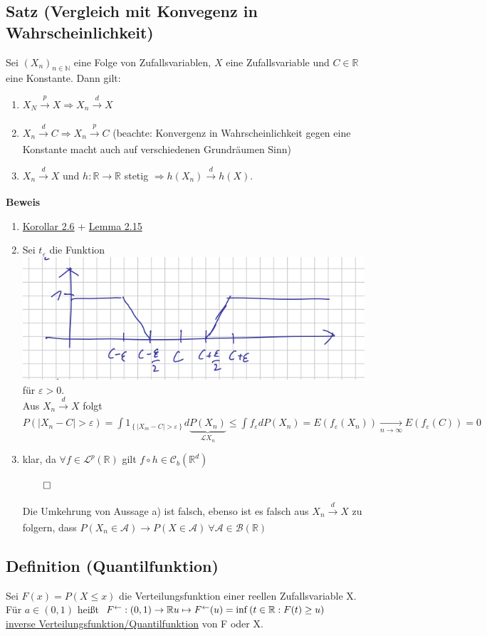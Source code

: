 \documentclass[german,10pt,oneside, fleqn, a4paper]{article}
\newcommand {\R}	{\mathbb{R}}
\newcommand {\N}	{\mathbb{N}}
\newcommand{\Ra}	{\Rightarrow}
\newcommand{\ra}{\rightarrow}
\newcommand{\brc}[1]{\left(#1\right)}
\newcommand{\brac}[1]{\left\lbrace #1\right\rbrace}
\newcommand{\folge}[3][\N]{\left(#2_#3\right)_{#3\in #1}}
\newcommand{\QED}{\begin{flushright}$\qed$\end{flushright}}
\newcommand{\mc}[1]{\mathcal{#1}}
\newcommand{\lp}[1]{\mc{L}^{#1}}
\newcommand{\beweis}{\textbf{Beweis}\\}
\newcommand{\toinf}{\rightarrow\infty}
\newcommand{\1}[1]{1_{#1}}
\newcommand{\2}[1]{\1{\brac{#1}}}
\newcommand{\xr}[2][]{\xrightarrow[#1]{#2}}
\newcommand{\cb}[1][d]{\mc{C}_b\brc{\R^{#1}}}
\begin{document}
\subsection{Satz (Vergleich mit Konvegenz in Wahrscheinlichkeit)}
\label{3.4}
Sei $\folge{X}{n}$ eine Folge von Zufallsvariablen, $X$ eine Zufallsvariable und $C\in\R$ eine  Konstante. Dann gilt:\begin{enumerate}[label=(\alph*)]
\item $X_N\xr{p}X\Ra X_n\xr{d}X$
\item $X_n\xr{d}C\Ra X_n\xr{p}C$ (beachte: Konvergenz in Wahrscheinlichkeit gegen eine Konstante macht auch auf verschiedenen Grundräumen Sinn)
\item $X_n\xr{d}X$ und $h:\R\ra\R$ stetig $\Ra h(X_n)\xr{d}h(X)$.
\end{enumerate}
\beweis
\begin{enumerate}[label=(\alph*)]
\item \hyperref[2.6]{Korollar 2.6} + \hyperref[2.15]{Lemma 2.15}
\item Sei $t_\varepsilon$ die Funktion\\
\includegraphics[scale=0.7]{3_4.png}\\
für $\varepsilon>0$.\\
Aus $X_n\xr{d}X$ folgt $P(|X_n-C|>\varepsilon)=\int \1{\brac{|X_m-C|>\varepsilon}}d\underbrace{P(X_n)}_{\mc{L}X_n}\leq\int f_\varepsilon dP(X_n)=E(f_\varepsilon(X_n))\xr[n\toinf]{}E(f_\varepsilon(C))=0$
\item klar, da $\forall f\in\lp{p}(\R)$ gilt $f\circ h\in\cb{}$\QED
Die Umkehrung von Aussage a) ist falsch, ebenso ist es falsch aus $X_n\xr{d}X$ zu folgern, dass $P(X_n\in\mc{A})\ra P(X\in\mc{A})\ \forall\mc{A}\in\mc{B}(\R)$
\end{enumerate}









\subsection{Definition (Quantilfunktion)}
\label{3.5}
Sei $F(x)=P(X\leq x)$ die Verteilungsfunktion einer reellen Zufallsvariable X. Für $a\in(0,1)$ heißt $F^\leftarrow:(0,1)\ra\R\\
u\mapsto F^\leftarrow(u)=\inf\brc{t\in\R:F(t)\geq u}$ \\\underline{inverse Verteilungsfunktion/Quantilfunktion} von F oder X.
\end{document}
